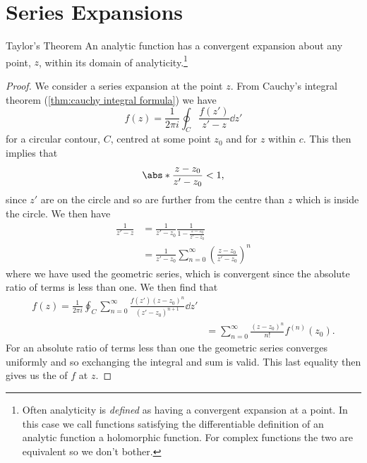 \documentclass[fleqn]{NotesClass}
\begin{document}
    \section{Series Expansions}
    \begin{thm}{Taylor's Theorem}{}
        An analytic function has a convergent expansion about any point, \(z\), within its domain of analyticity.\footnote{Often analyticity is \emph{defined} as having a convergent expansion at a point. In this case we call functions satisfying the differentiable definition of an analytic function a holomorphic function. For complex functions the two are equivalent so we don't bother.}
        \begin{proof}
            We consider a series expansion at the point \(z\).
            From Cauchy's integral theorem (\cref{thm:cauchy integral formula}) we have
            \begin{equation}
                f(z) = \frac{1}{2\pi i} \oint_C \frac{f(z')}{z' - z}\dd{z'}
            \end{equation}
            for a circular contour, \(C\), centred at some point \(z_0\) and for \(z\) within \(c\).
            This then implies that
            \begin{equation}
                \abs*{\frac{z - z_0}{z' - z_0}} < 1,
            \end{equation}
            since \(z'\) are on the circle and so are further from the centre than \(z\) which is inside the circle.
            We then have
            \begin{align}
                \frac{1}{z' - z} &= \frac{1}{z' - z_0}\frac{1}{1 - \frac{z - z_0}{z' - z_0}}\\
                &= \frac{1}{z' - z_0} \sum_{n=0}^{\infty} \left( \frac{z - z_0}{z' - z_0} \right)^n
            \end{align}
            where we have used the geometric series, which is convergent since the absolute ratio of terms is less than one.
            We then find that
            \begin{align}
                f(z) = \frac{1}{2\pi i} \oint_C \sum_{n=0}^{\infty} \frac{f(z')(z - z_0)^n}{(z' - z_0)^{n+1}} \dd{z'}\\
                &= \sum_{n=0}^{\infty} \frac{(z-z_0)^n}{n!}f^{(n)}(z_0).
            \end{align}
            For an absolute ratio of terms less than one the geometric series converges uniformly and so exchanging the integral and sum is valid.
            This last equality then gives us the  of \(f\) at \(z\).
        \end{proof}
    \end{thm}
    
\end{document}
